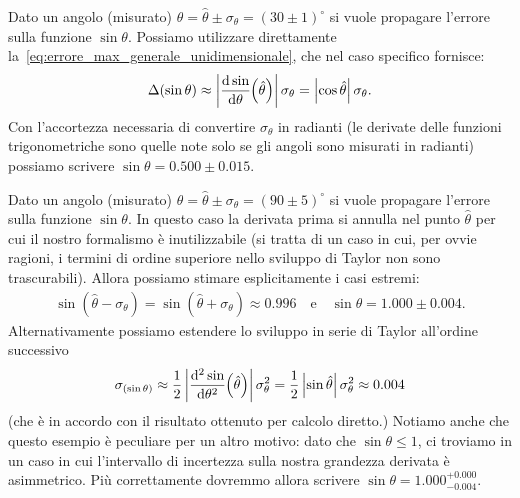 \begin{examplebox}
  \begin{example}
    Dato un angolo (misurato)
    $\theta = \hat{\theta} \pm \sigma_\theta = (30 \pm 1)^\circ$ si vuole
    propagare l'errore sulla funzione $\sin\theta$. Possiamo utilizzare
    direttamente la~\eqref{eq:errore_max_generale_unidimensionale}, che nel
    caso specifico fornisce:
    \begin{align*}
      \Delta(\sin\theta) \approx
      \abs{\td{\sin}{\theta}{\hat{\theta}}}\sigma_\theta =
      \abs{\cos\hat{\theta}}\sigma_\theta.
    \end{align*}
    Con l'accortezza necessaria di convertire $\sigma_\theta$ in radianti
    (le derivate delle funzioni trigonometriche sono quelle note solo se
    gli angoli sono misurati in radianti) possiamo scrivere
    $\sin\theta = 0.500 \pm  0.015$.
  \end{example}

  \begin{example}\label{exp:errore_max_derivata_nulla}
    Dato un angolo (misurato)
    $\theta = \hat{\theta} \pm \sigma_\theta = (90 \pm 5)^\circ$ si vuole
    propagare l'errore sulla funzione $\sin\theta$. In questo caso la derivata
    prima si annulla nel punto $\hat{\theta}$ per cui il nostro formalismo è
    inutilizzabile (si tratta di un caso in cui, per ovvie ragioni, i termini
    di ordine superiore nello sviluppo di Taylor non sono trascurabili).
    Allora possiamo stimare esplicitamente i casi estremi:
    \begin{align*}
      \sin(\hat\theta - \sigma_\theta) = \sin(\hat\theta + \sigma_\theta)
      \approx 0.996
      \quad \text{e} \quad \sin\theta = 1.000 \pm  0.004.
    \end{align*}
    Alternativamente possiamo estendere lo sviluppo in serie di Taylor
    all'ordine successivo
    \begin{align*}
      \sigma_{(\sin\theta)} \approx
      \frac{1}{2}\abs{\td[2]{\sin}{\theta}{\hat{\theta}}} \sigma_\theta^2
      = \frac{1}{2} \abs{\sin\hat{\theta}} \sigma_\theta^2 \approx 0.004
    \end{align*}
    (che è in accordo con il risultato ottenuto per calcolo diretto.)
    Notiamo anche che questo esempio è peculiare per un altro motivo:
    dato che $\sin\theta \leq 1$, ci troviamo in un caso in cui l'intervallo
    di incertezza sulla nostra grandezza derivata è asimmetrico. Più
    correttamente dovremmo allora scrivere $\sin\theta = 1.000^{+0.000}_{-0.004}$.
  \end{example}
\end{examplebox}

